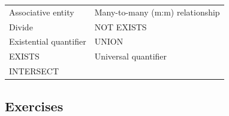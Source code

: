 \documentclass[
]{article}
\begin{document}
\begin{longtable}[]{@{}ll@{}}
\toprule()
\endhead
Associative entity & Many-to-many (m:m) relationship \\
Divide & NOT EXISTS \\
Existential quantifier & UNION \\
EXISTS & Universal quantifier \\
INTERSECT & \\
\bottomrule()
\end{longtable}

\hypertarget{exercises-2}{%
\subsection*{Exercises}\label{exercises-2}}
\end{document}
